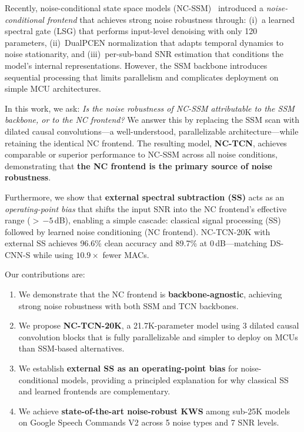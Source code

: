 \documentclass[conference]{IEEEtran}
\begin{document}
Recently, noise-conditional state space models (NC-SSM)~\cite{choi2026ncssm} introduced a \emph{noise-conditional frontend} that achieves strong noise robustness through:
(i)~a learned spectral gate (LSG) that performs input-level denoising with only 120 parameters,
(ii)~DualPCEN normalization that adapts temporal dynamics to noise stationarity, and
(iii)~per-sub-band SNR estimation that conditions the model's internal representations.
However, the SSM backbone introduces sequential processing that limits parallelism and complicates deployment on simple MCU architectures.

In this work, we ask: \emph{Is the noise robustness of NC-SSM attributable to the SSM backbone, or to the NC frontend?}
We answer this by replacing the SSM scan with dilated causal convolutions---a well-understood, parallelizable architecture---while retaining the identical NC frontend.
The resulting model, \textbf{NC-TCN}, achieves comparable or superior performance to NC-SSM across all noise conditions, demonstrating that \textbf{the NC frontend is the primary source of noise robustness}.

Furthermore, we show that \textbf{external spectral subtraction (SS)} acts as an \emph{operating-point bias} that shifts the input SNR into the NC frontend's effective range ($>$\,$-5$\,dB), enabling a simple cascade: classical signal processing (SS) followed by learned noise conditioning (NC frontend).
NC-TCN-20K with external SS achieves 96.6\% clean accuracy and 89.7\% at 0\,dB---matching DS-CNN-S while using $10.9\times$ fewer MACs.

Our contributions are:
\begin{enumerate}
    \item We demonstrate that the NC frontend is \textbf{backbone-agnostic}, achieving strong noise robustness with both SSM and TCN backbones.
    \item We propose \textbf{NC-TCN-20K}, a 21.7K-parameter model using 3 dilated causal convolution blocks that is fully parallelizable and simpler to deploy on MCUs than SSM-based alternatives.
    \item We establish \textbf{external SS as an operating-point bias} for noise-conditional models, providing a principled explanation for why classical SS and learned frontends are complementary.
    \item We achieve \textbf{state-of-the-art noise-robust KWS} among sub-25K models on Google Speech Commands V2 across 5 noise types and 7 SNR levels.
\end{enumerate}
\end{document}

